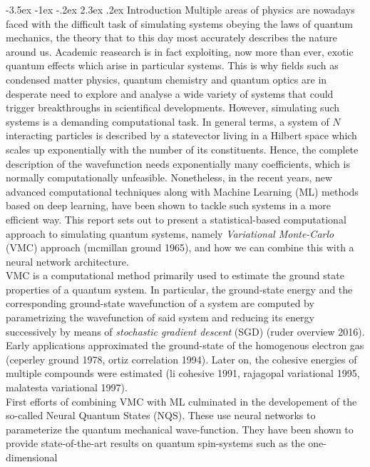 \documentclass[a4paper, 12pt, oneside]{article}
\makeatletter
\renewcommand{\section}{\@startsection {section}{1}{\z@}%
             {-3.5ex \@plus -1ex \@minus -.2ex}%
             {2.3ex \@plus.2ex}%
             {\normalfont\normalsize\bfseries}}
\makeatother
\begin{document}
\section{Introduction}
Multiple areas of physics are nowadays faced with the difficult task of simulating systems obeying the laws of 
quantum mechanics, the theory that to this day most accurately describes the nature around us. Academic reasearch 
is in fact exploiting, now more than ever, exotic quantum effects which arise in particular systems. This is why 
fields such as condensed matter physics, quantum chemistry and quantum optics are in desperate need to explore 
and analyse a wide variety of systems that could trigger breakthroughs in scientifical developments. 
However, simulating such systems is a demanding computational task. In general terms, a system of $N$ interacting 
particles is described by a statevector living in a Hilbert space which scales up exponentially with the number of 
its constituents. Hence, the complete description of the wavefunction needs exponentially many coefficients, which 
is normally computationally unfeasible. Nonetheless, in the recent years, new advanced computational techniques 
along with Machine Learning (ML) methods based on deep learning, have been shown to tackle such systems in a more efficient way. 
This report sets out to present a statistical-based computational approach to simulating quantum systems, 
namely \textit{Variational Monte-Carlo} (VMC) approach (mcmillan ground 1965), and how we can combine this 
with a neural network architecture.\\
VMC is a computational method primarily used to estimate the ground state properties of a quantum system. 
In particular, the ground-state energy and the corresponding ground-state wavefunction of a system are computed 
by parametrizing the wavefunction of said system and reducing its energy successively by means of 
\textit{stochastic gradient descent} (SGD) (ruder overview 2016). Early applications approximated the ground-state of 
the homogenous electron gas (ceperley ground 1978, ortiz correlation 1994). Later on, the cohesive energies of multiple compounds 
were estimated (li cohesive 1991, rajagopal variational 1995, malatesta variational 1997).  \\
First efforts of combining VMC with ML culminated in the developement of the so-called Neural Quantum 
States (NQS). These use neural networks to parameterize the quantum mechanical wave-function. They 
have been shown to provide state-of-the-art results on quantum spin-systems such as the one-dimensional 
\end{document}
